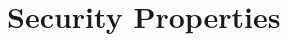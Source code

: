 \section{Security Properties}\label{sec:security_properties}
\vspace{7.5cm}



\vspace{-1.5mm}
\newpage

